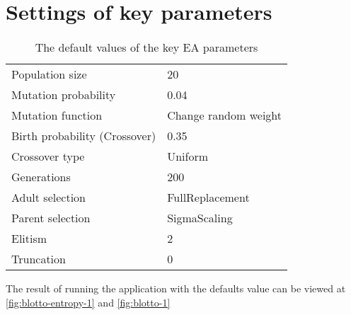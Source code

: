 \section{Settings of key parameters}

\begin{center}
    \begin{table}[H]
        \begin{tabular}{l l}
            Population size & 20 \\
            Mutation probability & 0.04 \\
            Mutation function & Change random weight \\
            Birth probability (Crossover) & 0.35 \\
            Crossover type & Uniform \\
            Generations & 200 \\
            Adult selection & FullReplacement \\
            Parent selection & SigmaScaling \\
            Elitism & 2 \\
            Truncation & 0 \\
        \end{tabular}
        \caption{The default values of the key EA parameters}
        \label{tab:defaultparams}
    \end{table}
\end{center}

The result of running the application with the defaults value can be viewed at \autoref{fig:blotto-entropy-1} and \autoref{fig:blotto-1}


